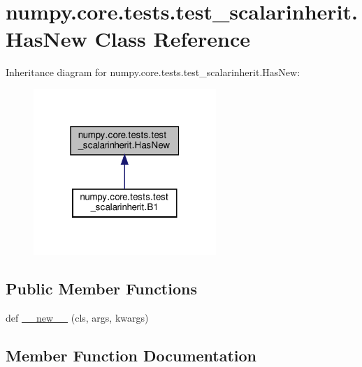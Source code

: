 \hypertarget{classnumpy_1_1core_1_1tests_1_1test__scalarinherit_1_1HasNew}{}\section{numpy.\+core.\+tests.\+test\+\_\+scalarinherit.\+Has\+New Class Reference}
\label{classnumpy_1_1core_1_1tests_1_1test__scalarinherit_1_1HasNew}


Inheritance diagram for numpy.\+core.\+tests.\+test\+\_\+scalarinherit.\+Has\+New\+:
\nopagebreak
\begin{figure}[H]
\begin{center}
\leavevmode
\includegraphics[width=196pt]{classnumpy_1_1core_1_1tests_1_1test__scalarinherit_1_1HasNew__inherit__graph}
\end{center}
\end{figure}
\subsection*{Public Member Functions}
\begin{DoxyCompactItemize}
\item 
def \hyperlink{classnumpy_1_1core_1_1tests_1_1test__scalarinherit_1_1HasNew_a2d6ecfa94853cad58b4b86baa44e5f98}{\+\_\+\+\_\+new\+\_\+\+\_\+} (cls, args, kwargs)
\end{DoxyCompactItemize}


\subsection{Member Function Documentation}
\mbox{\label{classnumpy_1_1core_1_1tests_1_1test__scalarinherit_1_1HasNew_a2d6ecfa94853cad58b4b86baa44e5f98}} 
